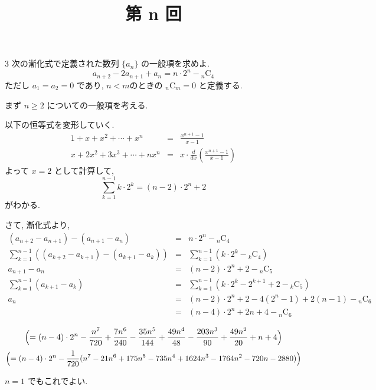\documentclass[uplatex,b5paper]{jsarticle}
\title{第 n 回}
\begin{document}
\maketitle

\begin{prob}3
  次の漸化式で定義された数列 \(\{a_n\}\) の一般項を求めよ.
  \[a_{n+2} - 2a_{n+1} + a_n = n\cdot2^n - {}_n\mathrm C_4\]
  ただし \(a_1 = a_2 = 0\) であり, \(n<m\)のときの \({}_n\mathrm C_m = 0\) と定義する.

  \vspace{2cm}
  まず \(n\geq2\) についての一般項を考える.

  以下の恒等式を変形していく.
  \begin{eqnarray*}
    1+x+x^2+\cdots+x^n &=& \frac{x^{n+1}-1}{x-1}\\
    x+2x^2+3x^3+\cdots+nx^n &=& x\cdot\frac d{dx}\left(\frac{x^{n+1}-1}{x-1}\right)
  \end{eqnarray*}
  よって \(x=2\) として計算して,
  \[\sum_{k=1}^{n-1}k\cdot2^k=(n-2)\cdot2^n+2\]
  がわかる.

  さて, 漸化式より,
  \begin{eqnarray*}
    (a_{n+2}-a_{n+1})-(a_{n+1}-a_n) &=& n\cdot2^n-{}_n\mathrm C_4\\
    \sum_{k=1}^{n-1}\left((a_{k+2}-a_{k+1})-(a_{k+1}-a_k)\right) &=& \sum_{k=1}^{n-1}\left(k\cdot2^k-{}_k\mathrm C_4\right)\\
    a_{n+1}-a_n &=& (n-2)\cdot2^n+2-{}_n\mathrm C_5\\
    \sum_{k=1}^{n-1}(a_{k+1}-a_k) &=& \sum_{k=1}^{n-1}\left(k\cdot2^k-2^{k+1}+2-{}_k\mathrm C_5\right)\\
    a_n &=& (n-2)\cdot2^n+2-4(2^n-1)+2(n-1)-{}_n\mathrm C_6\\
        &=& (n-4)\cdot2^n+2n+4-{}_n\mathrm C_6\\
  \end{eqnarray*}
   \[\Bigl(= (n-4)\cdot2^n-\frac{n^7}{720}+\frac{7n^6}{240}-\frac{35n^5}{144}+\frac{49n^4}{48}-\frac{203n^3}{90}+\frac{49n^2}{20}+n+4\Bigr)\]
  \[\Bigl(= (n-4)\cdot2^n-\frac1{720}(n^7-21n^6+175n^5-735n^4+1624n^3-1764n^2-720n-2880)\Bigr)\]

  \(n=1\) でもこれでよい.
\end{prob}
\newpage
\end{document}
